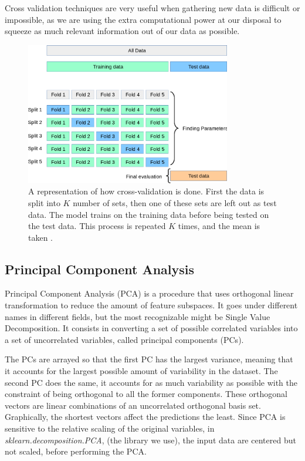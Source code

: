 	Cross validation techniques are very useful when gathering new data is difficult or impossible, as we are using the extra computational power at our disposal to squeeze as much relevant information out of our data as possible. 

\begin{figure}[h]
    \centering
    \includegraphics[width=0.8\textwidth]{theory/figures/grid_search_cross_validation.png}
    \caption{A representation of how cross-validation is done. First the data is split into $K$ number of sets, then one of these sets are left out as test data. The model trains on the training data before being tested on the test data. This process is repeated $K$ times, and the mean is taken \cite{fig:cross_validation}.}
    \label{fig:cross-validation}
\end{figure}

\FloatBarrier
\subsection{Principal Component Analysis }\label{sec:PCA}
	Principal Component Analysis (\ac{PCA}) \cite{james2013introduction} is a procedure that uses orthogonal linear transformation to reduce the amount of feature subspaces. It goes under different names in different fields, but the most recognizable might be Single Value Decomposition. It consists in converting a set of possible correlated variables into a set of uncorrelated variables, called principal components (\ac{PC}s). 
	
	The PCs are arrayed so that the first PC has the largest variance, meaning that it accounts for the largest possible amount of variability in the dataset. The second PC does the same, it accounts for as much variability as possible with the constraint of being orthogonal to all the former components. These orthogonal vectors are linear combinations of an uncorrelated orthogonal basis set. Graphically, the shortest vectors affect the predictions the least. Since PCA is sensitive to the relative scaling of the original variables, in \textit{sklearn.decomposition.PCA}, (the library we use), the input data are centered but not scaled, before performing the PCA.
	
